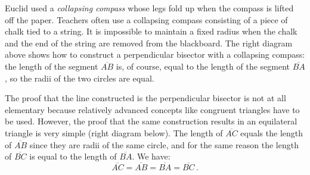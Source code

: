 \vspace{-2ex}

Euclid used a \emph{collapsing compass} whose legs fold up when the compass is lifted off the paper. Teachers often use a collapsing compass consisting of a piece of chalk tied to a string. It is impossible to maintain a fixed radius when the chalk and the end of the string are removed from the blackboard. The right diagram above shows how to construct a perpendicular bisector with a collapsing compass: the length of the segment $\overline{AB}$ is, of course, equal to the length of the segment $\overline{BA}$, so the radii of the two circles are equal.

The proof that the line constructed is the perpendicular bisector is not at all elementary because relatively advanced concepts like congruent triangles have to be used. However, the proof that the same construction results in an equilateral triangle is very simple (right diagram below). The length of $\overline{AC}$ equals the length of $\overline{AB}$ since they are radii of the same circle, and for the same reason the length of $\overline{BC}$ is equal to the length of $\overline{BA}$. We have:
\[
\overline{AC}=\overline{AB}=\overline{BA}=\overline{BC}\,.
\]

\begin{center}
\end{center}

